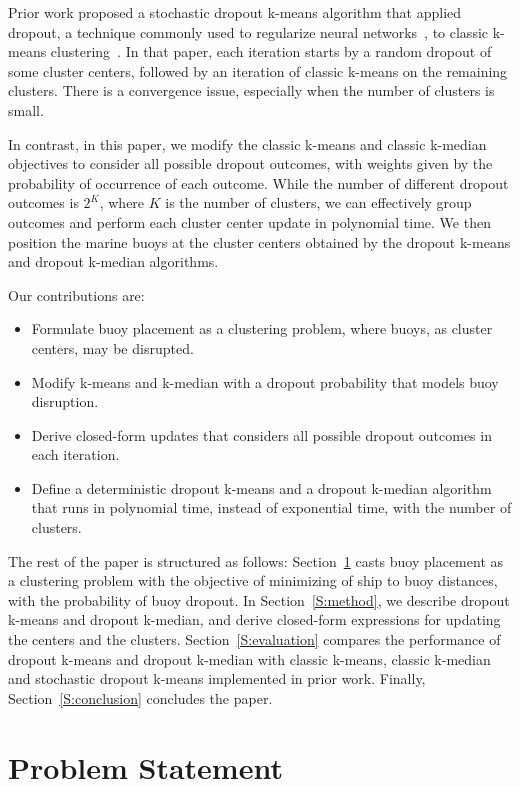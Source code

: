 \documentclass{article}
\begin{document}
Prior work proposed a stochastic dropout k-means algorithm that applied dropout, a technique commonly used to regularize neural networks~\cite{srivastava2014_dropout}, to classic k-means clustering~\cite{zhang2016_dropoutkmeans}. In that paper, each iteration starts by a random dropout of some cluster centers, followed by an iteration of classic k-means on the remaining clusters. There is a convergence issue, especially when the number of clusters is small.

In contrast, in this paper, we modify the classic k-means and classic k-median objectives to consider all possible dropout outcomes, with weights given by the probability of occurrence of each outcome. While the number of different dropout outcomes is $2^K$, where $K$ is the number of clusters, we can effectively group outcomes and perform each cluster center update in polynomial time. We then position the marine buoys at the cluster centers obtained by the dropout k-means and dropout k-median algorithms.

Our contributions are:
\begin{itemize}[noitemsep,nolistsep]
    \item Formulate buoy placement as a clustering problem, where buoys, as cluster centers, may be disrupted. 
    \item Modify k-means and k-median with a dropout probability that models buoy disruption.
    \item Derive closed-form updates that considers all possible dropout outcomes in each iteration.
    \item Define a deterministic dropout k-means and a dropout k-median algorithm that runs in polynomial time, instead of exponential time, with the number of clusters.
\end{itemize}

The rest of the paper is structured as follows: Section~\ref{S:problemstatement} casts buoy placement as a clustering problem with the objective of minimizing of ship to buoy distances, with the probability of buoy dropout. In Section~\ref{S:method}, we describe dropout k-means and dropout k-median, and derive closed-form expressions for updating the centers and the clusters. Section~\ref{S:evaluation} compares the performance of dropout k-means and dropout k-median with classic k-means, classic k-median and stochastic dropout k-means implemented in prior work. Finally, Section~\ref{S:conclusion} concludes the paper.

\section{Problem Statement}\label{S:problemstatement}
\end{document}
